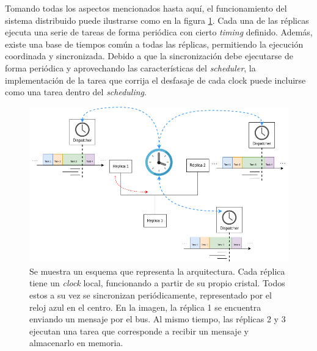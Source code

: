 Tomando todas los aspectos mencionados hasta aquí, el funcionamiento del sistema distribuido puede ilustrarse como en la figura \ref{fig:diagrama_TTA}. Cada una de las réplicas ejecuta una serie de tareas de forma periódica con cierto \textit{timing} definido. Además, existe una base de tiempos común a todas las réplicas, permitiendo la ejecución coordinada y sincronizada. Debido a que la sincronización debe ejecutarse de forma periódica y aprovechando las características del \textit{scheduler}, la implementación de la tarea que corrija el desfasaje de cada clock puede incluirse como una tarea dentro del \textit{scheduling}.


\begin{figure}[H]
    \centering
    \includegraphics[width=\textwidth]{img/diagrama_TTA.png}
    \caption{Se muestra un esquema que representa la arquitectura. Cada réplica tiene un \textit{clock} local, funcionando a partir de su propio cristal. Todos estos a su vez se sincronizan periódicamente, representado por el reloj azul en el centro. En la imagen, la réplica 1 se encuentra enviando un mensaje por el bus. Al mismo tiempo, las réplicas 2 y 3 ejecutan una tarea que corresponde a recibir un mensaje y almacenarlo en memoria.}
    \label{fig:diagrama_TTA}
\end{figure}






